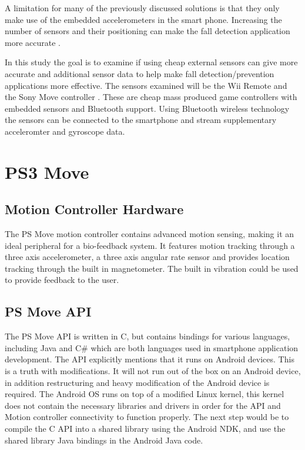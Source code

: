 \documentclass[11pt,twoside,a4paper]{report}
\begin{document}
A limitation for many of the previously discussed solutions is that they only make use of the embedded accelerometers in the smart phone. Increasing the number of sensors and their positioning can make the fall detection application more accurate \cite{fallDetectionWithExtraSensors}.

In this study the goal is to examine if using cheap external sensors can give more accurate and additional sensor data to help make fall detection/prevention applications more effective. The sensors examined will be the Wii Remote \cite{wiiRemote} and the Sony Move controller \cite{sonyMove}. These are cheap mass produced game controllers with embedded sensors and Bluetooth support. Using Bluetooth wireless technology the sensors can be connected to the smartphone and stream supplementary acceleromter and gyroscope data.

\section{PS3 Move}

\subsection{Motion Controller Hardware}
The PS Move motion controller contains advanced motion sensing, making it an ideal peripheral for a bio-feedback system. It features motion tracking through a three axis accelerometer, a three axis angular rate sensor and provides location tracking through the built in magnetometer. The built in vibration could be used to provide feedback to the user. %


\subsection{PS Move API}

The PS Move API \cite{PSMoveAPI} is written in C, but contains bindings for various languages, including Java and C\# which are both languages used in smartphone application development. The API explicitly mentions that it runs on Android devices. This is a truth with modifications. It will not run out of the box on an Android device, in addition restructuring and heavy modification of the Android device is required.  The Android OS runs on top of a modified Linux kernel, this kernel does not contain the necessary libraries and drivers in order for the API and Motion controller connectivity to function properly. %
The next step would be to compile the C API into a shared library using the Android NDK, and use the shared library Java bindings in the Android Java code.
\end{document}
